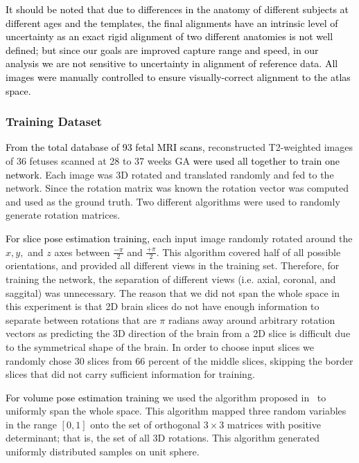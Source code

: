 \documentclass[journal,transmag]{IEEEtran}
\begin{document}
\textcolor{black}{It should be noted that due to differences in the anatomy of different subjects at different ages and the templates, \textcolor{black}{the final alignments have an intrinsic level of uncertainty as an exact rigid alignment of two different anatomies is not well defined;} but since our goals are improved capture range and speed, in our analysis we are not sensitive to uncertainty in alignment of reference data. %
All images were manually controlled to ensure visually-correct alignment to the atlas space.}

\subsubsection{Training Dataset}
\label{sec:trainset}
\textcolor{black}{From the total database of 93 fetal MRI scans,} reconstructed T2-weighted images of 36 fetuses scanned at 28 to 37 weeks GA \textcolor{black}{were used all together to train one network.} Each image was 3D rotated and translated randomly and fed to the network. Since the rotation matrix was known the rotation vector was computed and used as the ground truth. Two different algorithms were used to randomly generate rotation matrices.

\textcolor{black}{For slice pose estimation training,} each input image randomly rotated around the $x, y,$ and $z$ axes between $\frac{-\pi}{2}$ and $\frac{+\pi}{2}$. This algorithm covered half of all possible orientations, and provided all different views in the training set. Therefore, for training the network, the separation of different views (i.e. axial, coronal, and saggital) was unnecessary. The reason that we did not span the whole space in this experiment is that 2D brain slices do not have enough information to separate between rotations that are $\pi$ radians away around arbitrary rotation vectors as predicting the 3D direction of the brain from a 2D slice is difficult due to the symmetrical shape of the brain. In order to choose input slices we randomly chose 30 slices from 66 percent of the middle slices, skipping the border slices that did not carry sufficient information for training.

\textcolor{black}{For volume pose estimation training} %
we used the algorithm proposed in~\cite[p.~355]{arvo2013graphics} to uniformly span the whole space. This algorithm mapped three random variables in the range $[0,1]$ onto the set of orthogonal $3\times3$ matrices with positive determinant; that is, the set of all 3D rotations. %
This algorithm generated uniformly distributed samples on unit sphere.
\end{document}
